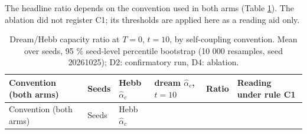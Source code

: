 The headline ratio depends on the convention used in both arms (Table
\ref{tbl:diag}). The ablation did not register C1; its thresholds are
applied here as a reading aid only.

\begin{longtable}[]{@{}
  >{\raggedright\arraybackslash}p{}
  >{\raggedright\arraybackslash}p{}
  >{\raggedright\arraybackslash}p{}
  >{\raggedright\arraybackslash}p{}
  >{\raggedright\arraybackslash}p{}
  >{\raggedright\arraybackslash}p{}@{}}
\caption{Dream/Hebb capacity ratio at \(T = 0\), \(t = 10\), by
self-coupling convention. Mean over seeds, 95 \% seed-level percentile
bootstrap (10 000 resamples, seed 20261025); D2: confirmatory run, D4:
ablation.}\label{tbl:diag}\tabularnewline
\toprule\noalign{}
\begin{minipage}[b]{\linewidth}\raggedright
Convention (both arms)
\end{minipage} & \begin{minipage}[b]{\linewidth}\raggedright
Seeds
\end{minipage} & \begin{minipage}[b]{\linewidth}\raggedright
Hebb \(\hat\alpha_c\)
\end{minipage} & \begin{minipage}[b]{\linewidth}\raggedright
dream \(\hat\alpha_c\), \(t = 10\)
\end{minipage} & \begin{minipage}[b]{\linewidth}\raggedright
Ratio
\end{minipage} & \begin{minipage}[b]{\linewidth}\raggedright
Reading under rule C1
\end{minipage} \\
\midrule\noalign{}
\endfirsthead
\toprule\noalign{}
\begin{minipage}[b]{\linewidth}\raggedright
Convention (both arms)
\end{minipage} & \begin{minipage}[b]{\linewidth}\raggedright
Seeds
\end{minipage} & \begin{minipage}[b]{\linewidth}\raggedright
Hebb \(\hat\alpha_c\)
\end{minipage} & \begin{minipage}[b]{\linewidth}\raggedright

\end{minipage}
\end{longtable}
